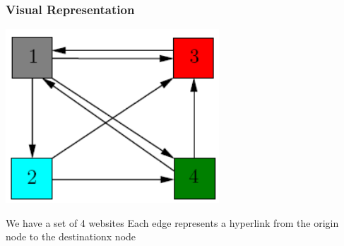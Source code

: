 \documentclass{beamer}
\begin{document}
\begin{frame}
\frametitle{Visual Representation}
\begin{center}
    \includegraphics[width=0.6\textwidth]{unweighted.png}
\end{center}
\begin{outline}
    \1 We have a set of 4 websites
    \1 Each edge represents a hyperlink from the origin node to the destinationx node 
\end{outline}
\end{frame}
\end{document}
